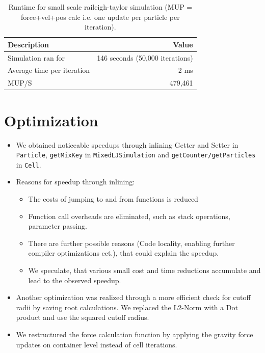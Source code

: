 \documentclass{article}
\begin{document}
\begin{table}[h!]
    \centering
    \begin{tabular}{|l|r|}
        \hline
        \textbf{Description} & \textbf{Value} \\ \hline
        Simulation ran for & 146 seconds (50,000 iterations) \\ \hline
        Average time per iteration & 2 ms \\ \hline
        MUP/S & 479,461 \\ \hline
    \end{tabular}
    \caption{Runtime for small scale raileigh-taylor simulation (MUP = force+vel+pos calc i.e. one update per particle per iteration).}
    \label{table:small_raileigh}
\end{table}

\section{Optimization}
\label{sec:opt}

    \begin{itemize}
        \item We obtained noticeable speedups through inlining Getter and Setter in \texttt{Particle}, \texttt{getMixKey} in \texttt{MixedLJSimulation} and \texttt{getCounter/getParticles} in \texttt{Cell}.
        \item Reasons for speedup through inlining:
        \begin{itemize}
            \item The costs of jumping to and from functions is reduced
            \item Function call overheads are eliminated, such as stack operations, parameter passing.
            \item There are further possible reasons (Code locality, enabling further compiler optimizations ect.), that could explain the speedup.
            \item We speculate, that various small cost and time reductions accumulate and lead to the observed speedup.
        \end{itemize}
        \item Another optimization was realized through a more efficient check for cutoff radii by saving root calculations. We replaced the L2-Norm with a Dot product and use the squared cutoff radius.
        \item We restructured the force calculation function by applying the gravity force updates on container level instead of cell iterations.
    \end{itemize}
\end{document}
